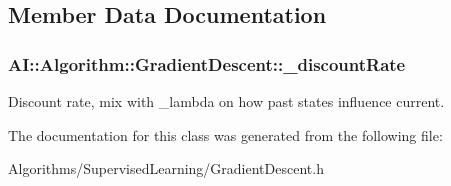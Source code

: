 \subsection{Member Data Documentation}
\hypertarget{classAI_1_1Algorithm_1_1GradientDescent_a4667068a5810028bef4e4eb0138da297}{
\subsubsection[{\+\_\+discount\+Rate}]{ A\+I\+::\+Algorithm\+::\+Gradient\+Descent\+::\+\_\+discount\+Rate\hspace{0.3cm}{\ttfamily [protected]}}}\label{classAI_1_1Algorithm_1_1GradientDescent_a4667068a5810028bef4e4eb0138da297}
Discount rate, mix with \+\_\+lambda on how past states influence current. 

The documentation for this class was generated from the following file\+:\begin{DoxyCompactItemize}
\item 
Algorithms/\+Supervised\+Learning/Gradient\+Descent.\+h\end{DoxyCompactItemize}
